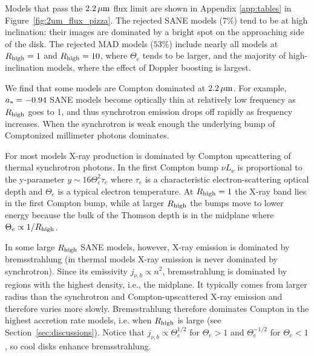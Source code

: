 Models that pass the $2.2\,\mu\mathrm{m}$ flux limit are shown in Appendix \ref{app:tables} in Figure~\ref{fig:2um_flux_pizza}.
The rejected SANE models ($7\%$) tend to be at high inclination: their images are dominated by a bright spot on the approaching side of the disk.
The rejected MAD models ($53\%$) include nearly all models at $R_\mathrm{high} = 1$ and $R_\mathrm{high} = 10$, where $\Theta_e$ tends to be larger, and the majority of high-inclination models, where the effect of Doppler boosting is largest.

We find that some models are Compton dominated at $2.2\,\mu\mathrm{m}$.
For example, $a_* = -0.94$ SANE models become optically thin at relatively low frequency as $R_\mathrm{high}$ goes to $1$, and thus synchrotron emission drops off rapidly as frequency increases.  When the synchrotron is weak enough the underlying bump of Comptonized millimeter photons dominates.  


For most models X-ray production is dominated by Compton upscattering of thermal synchrotron photons.
In the first Compton bump $\nu L_\nu$ is proportional to the y-parameter $y \sim 16 \Theta_e^2 \tau_e$ where $\tau_e$ is a characteristic electron-scattering optical depth and $\Theta_e$ is a typical electron temperature.
At $R_\mathrm{high} = 1$ the X-ray band lies in the first Compton bump, while at larger $R_\mathrm{high}$ the bumps move to lower energy because the bulk of the Thomson depth is in the midplane where $\Theta_e \propto 1/R_\mathrm{high}$.

In some large $R_\mathrm{high}$ SANE models, however, X-ray emission is dominated by bremsstrahlung (in thermal models X-ray emission is never dominated by synchrotron).
Since its emissivity $j_{\nu,b} \propto n^2$, bremsstrahlung is dominated by regions with the highest density, i.e., the midplane.
It typically comes from larger radius than the synchrotron and Compton-upscattered X-ray emission and therefore varies more slowly.
Bremsstrahlung therefore dominates Compton in the highest accretion rate models, i.e. when $R_\mathrm{high}$ is large (see Section~\ref{sec:discussions}).
Notice that $j_{\nu,b} \propto \Theta_e^{1/2}$ for $\Theta_e > 1$ and $\Theta_e^{-1/2}$ for $\Theta_e < 1$, so cool disks enhance bremsstrahlung.

